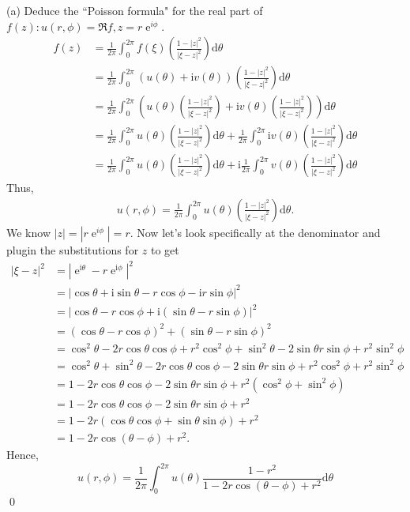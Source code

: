 \documentclass[10pt]{amsart}
\newcommand{\D}{\mathrm{d}}
\newcommand{\I}{\mathrm{i}}
\DeclareMathOperator{\E}{e}
\theoremstyle{nonumberplain}
\begin{document}
\begin{enumerate}[label={\bf {\arabic*}:}]
\noindent
(a) Deduce the ``Poisson formula" for the real part of $f(z): u(r, \phi) = \Re f, z = r\E^{i\phi}$.
\begin{align*}
f(z) &= \frac 1 {2\pi} \int_0^{2\pi} f(\xi) \left( \frac{1 - |z|^2}{|\xi - z|^2}\right) \D \theta \\
	&= \frac 1 {2\pi} \int_0^{2\pi} (u(\theta) + \I v(\theta))\left( \frac{1 - |z|^2}{|\xi - z|^2}\right) \D \theta \\
	&= \frac 1 {2\pi} \int_0^{2\pi} \left(u(\theta)\left( \frac{1 - |z|^2}{|\xi - z|^2}\right) + \I v(\theta)\left( \frac{1 - |z|^2}{|\xi - z|^2}\right)\right) \D \theta \\
	&= \frac 1 {2\pi} \int_0^{2\pi} u(\theta)\left( \frac{1 - |z|^2}{|\xi - z|^2}\right) \D \theta + \frac 1 {2\pi} \int_0^{2\pi} \I v(\theta)\left( \frac{1 - |z|^2}{|\xi - z|^2}\right) \D \theta \\
	&= \frac 1 {2\pi} \int_0^{2\pi} u(\theta)\left( \frac{1 - |z|^2}{|\xi - z|^2}\right) \D \theta + \I \frac 1 {2\pi} \int_0^{2\pi} v(\theta)\left( \frac{1 - |z|^2}{|\xi - z|^2}\right) \D \theta
\end{align*}
Thus,
\begin{align*}
u(r, \phi) = \frac 1 {2\pi} \int_0^{2\pi} u(\theta)\left( \frac{1 - |z|^2}{|\xi - z|^2}\right) \D \theta.
\end{align*}
We know $|z| = \left|r\E^{i\phi}\right| = r$.
Now let's look specifically at the denominator and plugin the substitutions for $z$ to get
\begin{align*}
|\xi - z|^2 &= |\E^{\I \theta} - r\E^{\I \phi}|^2 \\
	&= |\cos\theta + \I \sin\theta - r \cos \phi - \I r\sin \phi|^2 \\
	&= |\cos\theta - r \cos \phi + \I \left(\sin\theta - r\sin \phi \right)|^2 \\
	&= \left(\cos\theta - r \cos \phi\right)^2 + \left(\sin\theta - r\sin \phi \right)^2 \\
	&= \cos^2\theta - 2r \cos\theta\cos \phi + r^2 \cos^2 \phi + \sin^2\theta - 2\sin\theta r\sin \phi+ r^2\sin^2 \phi \\
	&= \cos^2\theta + \sin^2\theta - 2r \cos\theta\cos \phi - 2\sin\theta r\sin \phi + r^2 \cos^2 \phi +  r^2\sin^2 \phi \\
	&= 1 - 2r \cos\theta\cos \phi - 2\sin\theta r\sin \phi + r^2\left( \cos^2 \phi + \sin^2 \phi\right) \\
	&= 1 - 2r \cos\theta\cos \phi - 2\sin\theta r\sin \phi + r^2 \\
	&= 1 - 2r \left(\cos\theta \cos\phi + \sin\theta \sin\phi \right) + r^2 \\
	&= 1 - 2r \cos (\theta - \phi) + r^2.
\end{align*}
Hence,
$$
u(r, \phi) = \frac 1 {2\pi} \int_0^{2\pi} u(\theta) \frac{1 - r^2}{1 - 2r \cos (\theta - \phi) + r^2} \D \theta
$$
\qed \\


\end{enumerate}
\end{document}
